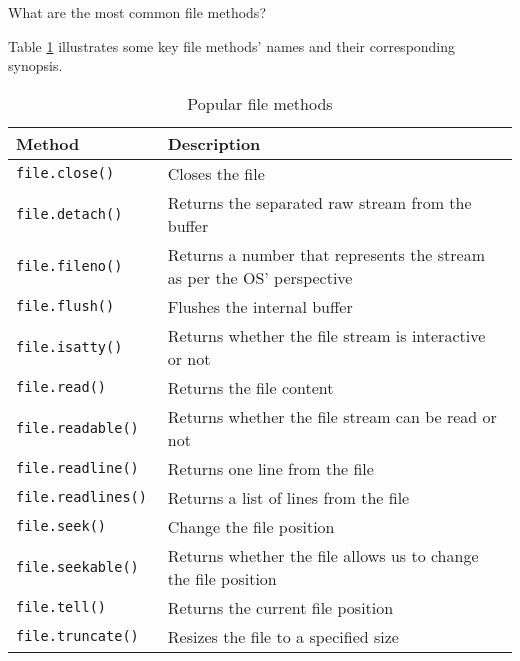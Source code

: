 \documentclass[a4paper,11pt]{book}
\numberwithin{figure}{chapter}
\numberwithin{table}{chapter}
\newcommand{\question}[1]{%
    \begin{tcolorbox}[colback=comp_c!10,colframe=comp_c,sidebyside align=top,width=\linewidth,before skip=1ex]
        #1
    \end{tcolorbox}
    \switchcolumn%
}
\newcommand{\note}[1]{%
    \begin{tcolorbox}[colback=white!0,colframe=white!10,width=\linewidth,before skip=1ex]
        #1
    \end{tcolorbox}
}
\begin{document}
\begin{paracol}{2}
	\question{\raggedright What are the most common file methods?}
	\note{Table \ref{tab:file-methods} illustrates some key file methods' names and their corresponding synopsis.}
\end{paracol}

\begin{table}[!htbp]
	\caption{Popular file methods}
	\label{tab:file-methods}
	\centering
	\begin{tabular}{ll}
		\toprule \toprule
		Method       & Description                                                                          \\
		\midrule
		\texttt{file.close()     } & Closes the file                                                                      \\
		\texttt{file.detach()    } & Returns the separated raw stream from the buffer                                     \\
		\texttt{file.fileno()    } & Returns a number that represents the stream as per the OS' perspective \\
		\texttt{file.flush()     } & Flushes the internal buffer                                                          \\
		\texttt{file.isatty()    } & Returns whether the file stream is interactive or not                                \\
		\texttt{file.read()      } & Returns the file content                                                             \\
		\texttt{file.readable()  } & Returns whether the file stream can be read or not                                   \\
		\texttt{file.readline()  } & Returns one line from the file                                                       \\
		\texttt{file.readlines() } & Returns a list of lines from the file                                                \\
		\texttt{file.seek()      } & Change the file position                                                             \\
		\texttt{file.seekable()  } & Returns whether the file allows us to change the file position                       \\
		\texttt{file.tell()      } & Returns the current file position                                                    \\
		\texttt{file.truncate()  } & Resizes the file to a specified size                                                 \\

\end{tabular}
\end{table}
\end{document}
